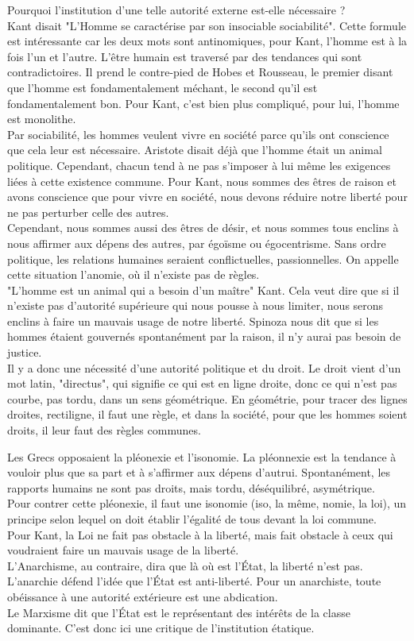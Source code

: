 \documentclass[10pt, a4paper, openany]{book}
\begin{document}
Pourquoi l'institution d'une telle autorité externe est-elle nécessaire ? \\
Kant disait "L'Homme se caractérise par son insociable sociabilité". Cette formule est intéressante car les deux mots sont antinomiques, pour Kant, l'homme est à la fois l'un et l'autre. L'être humain est traversé par des tendances qui sont contradictoires. Il prend le contre-pied de Hobes et Rousseau, le premier disant que l'homme est fondamentalement méchant, le second qu'il est fondamentalement bon. Pour Kant, c'est bien plus compliqué, pour lui, l'homme est monolithe. \\
Par sociabilité, les hommes veulent vivre en société parce qu'ils ont conscience que cela leur est nécessaire. Aristote disait déjà que l'homme était un animal politique. Cependant, chacun tend à ne pas s'imposer à lui même les exigences liées à cette existence commune. Pour Kant, nous sommes des êtres de raison et avons conscience que pour vivre en société, nous devons réduire notre liberté pour ne pas perturber celle des autres. \\
Cependant, nous sommes aussi des êtres de désir, et nous sommes tous enclins à nous affirmer aux dépens des autres, par égoïsme ou égocentrisme. Sans ordre politique, les relations humaines seraient conflictuelles, passionnelles. On appelle cette situation l'anomie, où il n'existe pas de règles. \\
"L'homme est un animal qui a besoin d'un maître" Kant. Cela veut dire que si il n'existe pas d'autorité supérieure qui nous pousse à nous limiter, nous serons enclins à faire un mauvais usage de notre liberté. Spinoza nous dit que si les hommes étaient gouvernés spontanément par la raison, il n'y aurai pas besoin de justice. \\
Il y a donc une nécessité d'une autorité politique et du droit. Le droit vient d'un mot latin, "directus", qui signifie ce qui est en ligne droite, donc ce qui n'est pas courbe, pas tordu, dans un sens géométrique. En géométrie, pour tracer des lignes droites, rectiligne, il faut une règle, et dans la société, pour que les hommes soient droits, il leur faut des règles communes. 


Les Grecs opposaient la pléonexie et l'isonomie. La pléonnexie est la tendance à vouloir plus que sa part et à s'affirmer aux dépens d'autrui. Spontanément, les rapports humains ne sont pas droits, mais tordu, déséquilibré, asymétrique. \\
Pour contrer cette pléonexie, il faut une isonomie (iso, la même, nomie, la loi), un principe selon lequel on doit établir l'égalité de tous devant la loi commune. \\
Pour Kant, la Loi ne fait pas obstacle à la liberté, mais fait obstacle à ceux qui voudraient faire un mauvais usage de la liberté. \\
L'Anarchisme, au contraire, dira que là où est l'État, la liberté n'est pas. L'anarchie défend l'idée que l'État est anti-liberté. Pour un anarchiste, toute obéissance à une autorité extérieure est une abdication. \\
Le Marxisme dit que l'État est le représentant des intérêts de la classe dominante. C'est donc ici une critique de l'institution étatique. 
\end{document}
